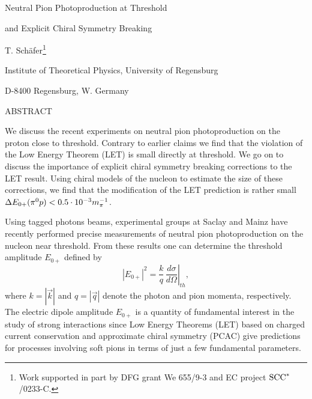 \newcommand{\reseteqn}{\setcounter{equation}{\value{saveeqn}}%
\renewcommand{\theequation}{\arabic{equation}}}
%
%
\makeatletter
\long{}
\makeatother 
%
%
\pagestyle{empty} 
\textwidth15.0cm
\hoffset-25pt

\renewcommand{\thefootnote}{\fnsymbol{footnote}} 
\centerline{\LARGE Neutral Pion Photoproduction at Threshold} 
\vskip8pt
\centerline{\LARGE and Explicit Chiral Symmetry Breaking}
\vskip1.5cm
\centerline{T. Sch\"afer\footnote{Work supported in part by
 DFG grant We 655/9-3 and EC project ${\rm SCC}^{*}$/0233-C.}}
\centerline{ Institute of Theoretical Physics, 
         University of Regensburg}
\centerline{  D-8400 Regensburg, W. Germany}
\vskip1.5cm  
\centerline{ABSTRACT}
\begin{center}
\begin{minipage}[t]{12.7cm}
{\footnotesize
We discuss the recent experiments on neutral
pion photoproduction on the proton close to threshold. Contrary to
earlier claims we find that the violation of the Low Energy Theorem
(LET) is small directly at threshold. We go on to discuss the 
importance of explicit chiral symmetry breaking corrections to the
LET result. Using chiral models of the nucleon to estimate
the size of these corrections, we find that the modification of the
LET prediction is rather small $\Delta E_{0+}(\pi^0p)<0.5\cdot 10^{-3} m_\pi^{-1}$.}
\end{minipage}
\end{center}
\vskip1cm
\setcounter{footnote}{0}
\renewcommand{\thefootnote}{\arabic{footnote}}
Using tagged photons beams, experimental groups at Saclay \cite{Maz86} and
Mainz \cite{Bec89,Bec90} have recently performed precise measurements of 
neutral pion photoproduction on the nucleon near threshold. From these 
results one can determine the threshold amplitude $E_{0+}$ defined by
\begin{equation}
|E_{0+}|^2 =
\left. \frac{k}{q}\, 
\frac{d \sigma}{d \Omega}
 \right|_{th}  ,
\end{equation}
where $k=|\vec{k}|$ and $q=|\vec{q}|$ denote the photon and pion momenta, 
respectively. The electric dipole amplitude $E_{0+}$ is a quantity of 
fundamental interest in the study of strong interactions since  Low Energy
Theorems (LET) based on charged current conservation and approximate chiral
symmetry (PCAC) give predictions for processes involving soft pions in terms
of just a few fundamental parameters.

